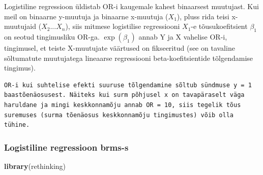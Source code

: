 \documentclass[]{book}
\newenvironment{Shaded}{\begin{snugshade}}{\end{snugshade}}
\newcommand{\KeywordTok}[1]{\textcolor[rgb]{0.13,0.29,0.53}{\textbf{#1}}}
\newcommand{\NormalTok}[1]{#1}
\begin{document}
Logistiline regressioon üldistab OR-i kaugemale kahest binaarsest
muutujast. Kui meil on binaarne y-muutuja ja binaarne x-muutuja
(\(X_1\)), pluss rida teisi x-muutujaid (\(X_2...X_n\)), siis mitmese
logistilise regressiooni \(X_1\)-e tõusukoefitsient \(\beta_1\) on
seotud tingimusliku OR-ga. \(\exp(\beta_1)\) annab Y ja X vahelise OR-i,
tingimusel, et teiste X-muutujate väärtused on fikseeritud (see on
tavaline sõltumatute muutujatega lineaarse regressiooni
beta-koefitsientide tõlgendamise tingimus).

\begin{verbatim}
OR-i kui suhtelise efekti suuruse tõlgendamine sõltub sündmuse y = 1 
baastõenäosusest. Näiteks kui surm põhjusel x on tavapäraselt väga 
haruldane ja mingi keskkonnamõju annab OR = 10, siis tegelik tõus 
suremuses (surma tõenäosus keskkonnamõju tingimustes) võib olla tühine. 
\end{verbatim}

\subsubsection{Logistiline regressioon
brms-s}\label{logistiline-regressioon-brms-s}

\begin{Shaded}
\begin{Highlighting}[]
\KeywordTok{library}\NormalTok{(rethinking)}
\end{Highlighting}
\end{Shaded}
\end{document}
